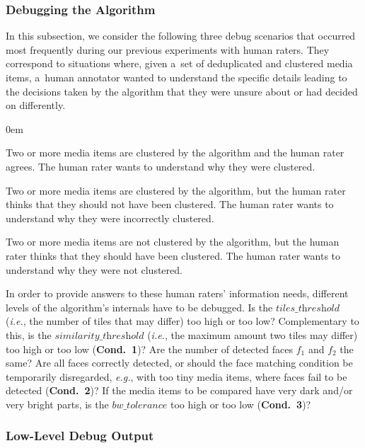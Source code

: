 \subsubsection{Debugging the Algorithm}
\label{sec:debugging-the-algorithm}

In this subsection, we consider the following three debug scenarios
that occurred most frequently during our previous experiments with human raters.
They correspond to situations where, given a~set of
deduplicated and clustered media items, a~human annotator wanted
to understand the specific details leading to the decisions
taken by the algorithm that they were unsure about or had decided on differently.

\begin{description}
  \itemsep0em
  \item[Clustering Consent.] Two or more media items are clustered
    by the algorithm and the human rater agrees.
    The human rater wants to understand why they were clustered.
  \item[Clustering Dissent.] Two or more media items are clustered
    by the algorithm, but the human rater thinks
    that they should not have been clustered.
    The human rater wants to understand why they were incorrectly clustered.
  \item[Non-Clustering Dissent.] Two or more media items are not clustered
  by the algorithm, but the human rater thinks
  that they should have been clustered.
  The human rater wants to understand why they were not clustered.
\end{description}

In order to provide answers to these human raters' information needs,
different levels of the algorithm's internals have to be debugged.
Is the $\textit{tiles\_threshold}$ (\emph{i.e.},
the number of tiles that may differ) too high or too low?
Complementary to this, is the $\textit{similarity\_threshold}$
(\emph{i.e.}, the maximum amount two tiles may differ)
too high or too low (\textbf{Cond.~1})?
Are the number of detected faces $f_1$ and $f_2$ the same?
Are all faces correctly detected, or should the face matching condition
be temporarily disregarded, \emph{e.g.}, with too tiny media items,
where faces fail to be detected (\textbf{Cond.~2})?
If the media items to be compared have very dark and/or very bright parts,
is the $\textit{bw\_tolerance}$ too high or too low (\textbf{Cond.~3})?

\subsubsection{Low-Level Debug Output}
\label{sec:low-level-debug-output}

